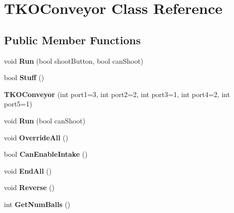 \hypertarget{class_t_k_o_conveyor}{\section{T\-K\-O\-Conveyor Class Reference}
\label{class_t_k_o_conveyor}
}
\subsection*{Public Member Functions}
\begin{DoxyCompactItemize}
\item 
\hypertarget{class_t_k_o_conveyor_a06d6adff52d9b77308ed1d29f47b1bf8}{void {\bfseries Run} (bool shoot\-Button, bool can\-Shoot)}\label{class_t_k_o_conveyor_a06d6adff52d9b77308ed1d29f47b1bf8}

\item 
\hypertarget{class_t_k_o_conveyor_a8fe70dce57a1e7e7124177cc9413dbd3}{bool {\bfseries Stuff} ()}\label{class_t_k_o_conveyor_a8fe70dce57a1e7e7124177cc9413dbd3}

\item 
\hypertarget{class_t_k_o_conveyor_a68d6a4bdf4c7f640da4977366c2e6add}{{\bfseries T\-K\-O\-Conveyor} (int port1=3, int port2=2, int port3=1, int port4=2, int port5=1)}\label{class_t_k_o_conveyor_a68d6a4bdf4c7f640da4977366c2e6add}

\item 
\hypertarget{class_t_k_o_conveyor_ac46547907a0ff74117d63e134d1c5985}{void {\bfseries Run} (bool can\-Shoot)}\label{class_t_k_o_conveyor_ac46547907a0ff74117d63e134d1c5985}

\item 
\hypertarget{class_t_k_o_conveyor_aabaebf6851e31ec3c258534441aeb814}{void {\bfseries Override\-All} ()}\label{class_t_k_o_conveyor_aabaebf6851e31ec3c258534441aeb814}

\item 
\hypertarget{class_t_k_o_conveyor_ab998b5ba247e2dc337f01840cc6ade2f}{bool {\bfseries Can\-Enable\-Intake} ()}\label{class_t_k_o_conveyor_ab998b5ba247e2dc337f01840cc6ade2f}

\item 
\hypertarget{class_t_k_o_conveyor_adf4e54d355bc30f1da5a822cdecece12}{void {\bfseries End\-All} ()}\label{class_t_k_o_conveyor_adf4e54d355bc30f1da5a822cdecece12}

\item 
\hypertarget{class_t_k_o_conveyor_a7ed68e1b021a999dda718f02ea28c7ef}{void {\bfseries Reverse} ()}\label{class_t_k_o_conveyor_a7ed68e1b021a999dda718f02ea28c7ef}

\item 
\hypertarget{class_t_k_o_conveyor_a8d06cb72e39a9f8da636f0556b4ffd90}{int {\bfseries Get\-Num\-Balls} ()}\label{class_t_k_o_conveyor_a8d06cb72e39a9f8da636f0556b4ffd90}

\end{DoxyCompactItemize}


